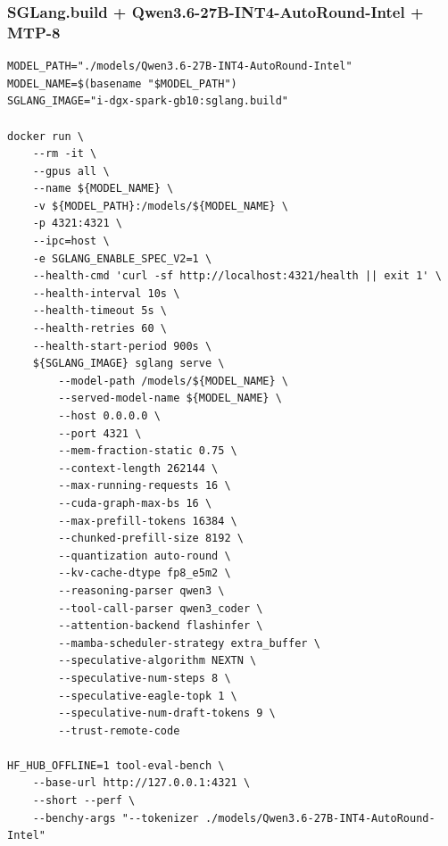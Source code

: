 \documentclass{article}
\begin{document}
\subsubsection{SGLang.build + Qwen3.6-27B-INT4-AutoRound-Intel + MTP-8}
\begin{lstlisting}
MODEL_PATH="./models/Qwen3.6-27B-INT4-AutoRound-Intel"
MODEL_NAME=$(basename "$MODEL_PATH")
SGLANG_IMAGE="i-dgx-spark-gb10:sglang.build"

docker run \
    --rm -it \
    --gpus all \
    --name ${MODEL_NAME} \
    -v ${MODEL_PATH}:/models/${MODEL_NAME} \
    -p 4321:4321 \
    --ipc=host \
    -e SGLANG_ENABLE_SPEC_V2=1 \
    --health-cmd 'curl -sf http://localhost:4321/health || exit 1' \
    --health-interval 10s \
    --health-timeout 5s \
    --health-retries 60 \
    --health-start-period 900s \
    ${SGLANG_IMAGE} sglang serve \
        --model-path /models/${MODEL_NAME} \
        --served-model-name ${MODEL_NAME} \
        --host 0.0.0.0 \
        --port 4321 \
        --mem-fraction-static 0.75 \
        --context-length 262144 \
        --max-running-requests 16 \
        --cuda-graph-max-bs 16 \
        --max-prefill-tokens 16384 \
        --chunked-prefill-size 8192 \
        --quantization auto-round \
        --kv-cache-dtype fp8_e5m2 \
        --reasoning-parser qwen3 \
        --tool-call-parser qwen3_coder \
        --attention-backend flashinfer \
        --mamba-scheduler-strategy extra_buffer \
        --speculative-algorithm NEXTN \
        --speculative-num-steps 8 \
        --speculative-eagle-topk 1 \
        --speculative-num-draft-tokens 9 \
        --trust-remote-code

HF_HUB_OFFLINE=1 tool-eval-bench \
    --base-url http://127.0.0.1:4321 \
    --short --perf \
    --benchy-args "--tokenizer ./models/Qwen3.6-27B-INT4-AutoRound-Intel"
\end{lstlisting}
\end{document}
